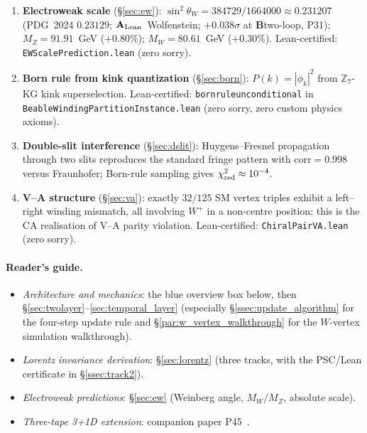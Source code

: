\documentclass[11pt]{article}
\theoremstyle{remark}
\newcommand{\ZS}{\mathbb{Z}_7}
\newcommand{\lean}[1]{%
  \penalty-100
  \begingroup\def\_{\textunderscore\allowbreak}\texttt{#1}\endgroup}
\newcommand{\sinwsq}{\sin^2\!\theta_W}
\newcommand{\Mw}{M_W}
\newcommand{\Mz}{M_Z}
\newcommand{\CatAL}{\ensuremath{\textbf{A}_{\rm Lean}}}
\newcommand{\CatB}{\textbf{B}}
\begin{document}
\begin{enumerate}[noitemsep]
  \item \textbf{Electroweak scale} (\S\ref{sec:ew}):
    $\sinwsq=384729/1664000\approx 0.231207$ (PDG~2024 $0.23129$; \CatAL\ Wolfenstein; $+0.038\sigma$ at \CatB two-loop, P31);
    $\Mz=91.91$~GeV ($+0.80\%$); $\Mw=80.61$~GeV ($+0.30\%$).
    Lean-certified: \lean{EWScalePrediction.lean} (zero sorry).

  \item \textbf{Born rule from kink quantization}
    (\S\ref{sec:born}):
    $P(k)=|\phi_k|^2$ from $\ZS$-KG kink superselection.
    Lean-certified: \lean{born\_rule\_unconditional} in
    \lean{BeableWindingPartitionInstance.lean} (zero sorry, zero custom
    physics axioms).

  \item \textbf{Double-slit interference} (\S\ref{sec:dslit}):
    Huygens--Fresnel propagation through two slits reproduces the standard
    fringe pattern with $\mathrm{corr}=0.998$ versus Fraunhofer;
    Born-rule sampling gives $\chi^2_{\rm red}\approx10^{-4}$.

  \item \textbf{V--A structure} (\S\ref{sec:va}):
    exactly $32/125$ SM vertex triples exhibit a
    left--right winding mismatch, all involving $W^+$ in a non-centre
    position; this is the CA realisation of V--A parity violation.
    Lean-certified: \lean{ChiralPairVA.lean} (zero sorry).
\end{enumerate}

\paragraph{Reader's guide.}
\begin{itemize}[noitemsep]
  \item \emph{Architecture and mechanics}: the blue overview box below, then
    \S\ref{sec:twolayer}--\ref{sec:temporal_layer} (especially
    \S\ref{ssec:update_algorithm} for the four-step update rule and
    \S\ref{par:w_vertex_walkthrough} for the $W$-vertex simulation walkthrough).
  \item \emph{Lorentz invariance derivation}: \S\ref{sec:lorentz} (three tracks,
    with the PSC/Lean certificate in \S\ref{ssec:track2}).
  \item \emph{Electroweak predictions}: \S\ref{sec:ew} (Weinberg angle,
    $M_W/M_Z$, absolute scale).
  \item \emph{Three-tape 3+1D extension}: companion paper P45~\cite{SpivackThreeTapeCMCA}.
\end{itemize}
\end{document}
